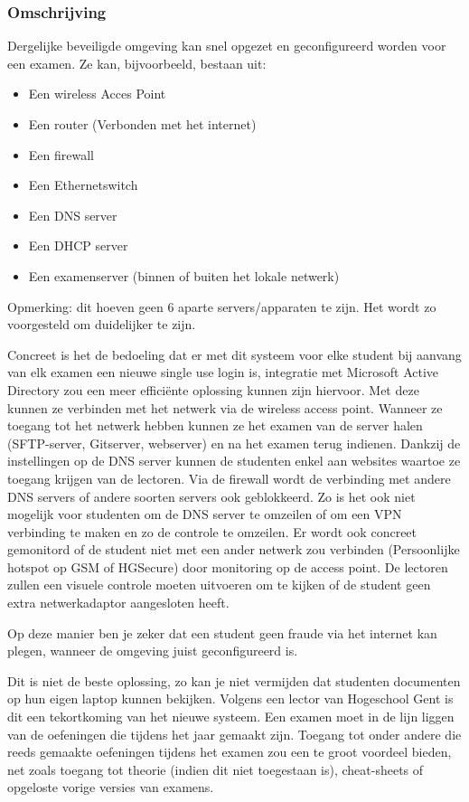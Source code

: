 \subsubsection{Omschrijving}
Dergelijke beveiligde omgeving kan snel opgezet en geconfigureerd worden voor een examen. Ze kan, bijvoorbeeld, bestaan uit:
\begin{itemize}
\item Een wireless Acces Point
\item Een router (Verbonden met het internet)
\item Een firewall
\item Een Ethernetswitch 
\item Een DNS server
\item Een DHCP server
\item Een examenserver (binnen of buiten het lokale netwerk)

\end{itemize}
Opmerking: dit hoeven geen 6 aparte servers/apparaten te zijn. Het wordt zo voorgesteld om duidelijker te zijn.

Concreet is het de bedoeling dat er met dit systeem voor elke student bij aanvang van elk examen een nieuwe single use login is, integratie met Microsoft Active Directory zou een meer effici\"{e}nte oplossing kunnen zijn hiervoor. Met deze kunnen ze verbinden met het netwerk via de wireless access point. Wanneer ze toegang tot het netwerk hebben kunnen ze het examen van de server halen (SFTP-server, Gitserver, webserver) en na het examen terug indienen. Dankzij de instellingen op de DNS server kunnen de studenten enkel aan websites waartoe ze toegang krijgen van de lectoren. Via de firewall wordt de verbinding met andere DNS servers of andere soorten servers ook geblokkeerd. Zo is het ook niet mogelijk voor studenten om de DNS server te omzeilen of om een VPN verbinding te maken en zo de controle te omzeilen. Er wordt ook concreet gemonitord of de student niet met een ander netwerk zou verbinden (Persoonlijke hotspot op GSM of HGSecure) door monitoring op de access point. De lectoren zullen een visuele controle moeten uitvoeren om te kijken of de student geen extra netwerkadaptor aangesloten heeft. 

Op deze manier ben je zeker dat een student geen fraude via het internet kan plegen, wanneer de omgeving juist geconfigureerd is.

Dit is niet de beste oplossing, zo kan je niet vermijden dat studenten documenten op hun eigen laptop kunnen bekijken. Volgens een lector van Hogeschool Gent is dit een tekortkoming van het nieuwe systeem. Een examen moet in de lijn liggen van de oefeningen die tijdens het jaar gemaakt zijn. Toegang tot onder andere die reeds gemaakte oefeningen tijdens het examen zou een te groot voordeel bieden, net zoals toegang tot theorie (indien dit niet toegestaan is), cheat-sheets of opgeloste vorige versies van examens. 




